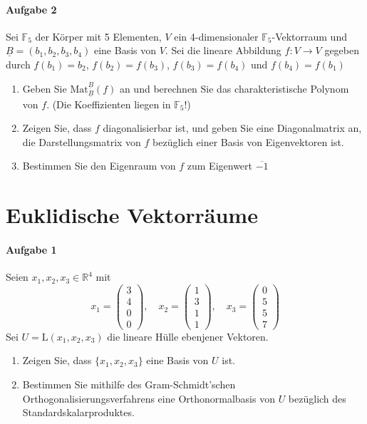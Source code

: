 \documentclass{scrartcl}
\begin{document}
	\paragraph{Aufgabe 2}
	Sei $\mathbb{F}_5$ der Körper mit 5 Elementen,
	$V$ ein 4-dimensionaler $\mathbb{F}_5$-Vektorraum
	und $\underline{B}=(b_1,b_2,b_3,b_4)$ eine Basis von $V$.
	Sei die lineare Abbildung $f: V\to V$ gegeben
	durch $f(b_1)=b_2$, $f(b_2)=f(b_3)$, $f(b_3)=f(b_4)$ und $f(b_4)=f(b_1)$
	\begin{enumerate}[label=(\alph*)]
		\item Geben Sie $\text{Mat}_{\underline{B}}^{\underline{B}}(f)$ an
			und berechnen Sie das charakteristische Polynom von $f$.
			(Die Koeffizienten liegen in $\mathbb{F}_5$!)
		\item Zeigen Sie, dass $f$ diagonalisierbar ist,
			und geben Sie eine Diagonalmatrix an, die Darstellungsmatrix von $f$
			bezüglich einer Basis von Eigenvektoren ist.
		\item Bestimmen Sie den Eigenraum von $f$ zum Eigenwert $\overline{-1}$
	\end{enumerate}
	\section{Euklidische Vektorräume}
	\paragraph{Aufgabe 1}
	Seien $x_1, x_2, x_3\in\mathbb{R}^4$ mit
	\[x_1=\begin{pmatrix}3\\4\\0\\0\end{pmatrix},\quad
	x_2=\begin{pmatrix}1\\3\\1\\1\end{pmatrix},\quad
	x_3=\begin{pmatrix}0\\5\\5\\7\end{pmatrix}\]
	Sei $U=\text{L}(x_1,x_2,x_3)$ die lineare Hülle ebenjener Vektoren.
	\begin{enumerate}[label=(\alph*)]
		\item Zeigen Sie, dass $\{x_1,x_2,x_3\}$ eine Basis von $U$ ist.
		\item Bestimmen Sie mithilfe des Gram-Schmidt'schen
			Orthogonalisierungsverfahrens eine Orthonormalbasis
			von $U$ bezüglich des Standardskalarproduktes.
	\end{enumerate}
\end{document}

